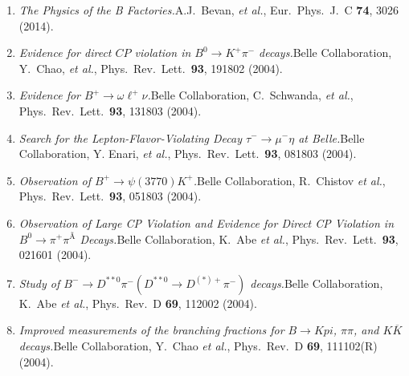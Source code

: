 \documentclass[10pt,a4paper]{article}
\def\pub#1#2#3{{\it #1.}\newline #2, #3.}
\def\mybpub#1#2#3{{\boldmath \bf #1.}\newline #2, #3.}
\def\cited#1{Cited $\ge$ #1}
\def\PRL{Phys.\ Rev.\ Lett.\ }
\def\PRD{Phys.\ Rev.\ D }
\def\etal{{\it et al.}}
\def\belle{Belle Collaboration, K.~Abe \etal }
\begin{document}
\begin{enumerate}


%

\item
\pub{The Physics of the B Factories}
{A.J.~Bevan, \etal}
{Eur.\ Phys.\ J.\ C {\bf 74}, 3026 (2014)}

\item
\pub{Evidence for direct $CP$ violation in $B^0 \to K^+ \pi^-$ decays}
{Belle Collaboration, Y.~Chao, \etal}
{\PRL {\bf 93}, 191802 (2004)}

\item
\pub{Evidence for $B^+ \to \omega \ell^+ \nu$}
{Belle Collaboration, C.~Schwanda, \etal}
{\PRL {\bf 93}, 131803 (2004)}

\item
\pub{Search for the Lepton-Flavor-Violating Decay $\tau^- \to \mu^- \eta$ at Belle}
{Belle Collaboration, Y. Enari, \etal}
{\PRL {\bf 93}, 081803 (2004)}

\item
\pub{Observation of $B^+ \to \psi(3770) K^+$}
{Belle Collaboration, R.~Chistov \etal}
{\PRL {\bf 93}, 051803 (2004)}

\item
\pub{Observation of Large CP Violation and Evidence for Direct CP Violation in $B^0 \to \pi^+ \pi^Ã$ Decays}
{\belle}
{\PRL {\bf 93}, 021601 (2004)}

\item
\pub{Study of $B^- \to D^{**0}\pi^- (D^{**0} \to D^{(*)+}\pi^-)$ decays}
{Belle Collaboration, K.~Abe \etal}
{\PRD {\bf 69}, 112002 (2004)}

\item
\pub{Improved measurements of the branching fractions for $B \to Kpi$, $\pi\pi$, and $K \overline{K}$ decays}
{Belle Collaboration, Y.~Chao \etal}
{\PRD {\bf 69}, 111102(R) (2004)}


\end{enumerate}
\end{document}
